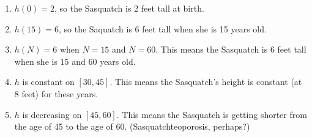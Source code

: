 \begin{enumerate}
\setcounter{enumi}{\value{HW}}

\item  $h(0) = 2$, so the Sasquatch is 2 feet tall at birth.

\item  $h(15) = 6$, so the Saquatch is 6 feet tall when she is 15 years old.

\item  $h(N) = 6$ when $N = 15$ and $N=60$.  This means the Sasquatch is 6 feet tall when she is 15 and 60 years old.

\item  $h$ is constant on $[30,45]$.  This means the Sasquatch's height is constant (at 8 feet) for these years.

\item  $h$ is decreasing on $[45,60]$.  This means the Sasquatch is getting shorter from the age of 45 to the age of 60. (Sasquatchteoporosis, perhaps?)

\setcounter{HW}{\value{enumi}}
\end{enumerate}


